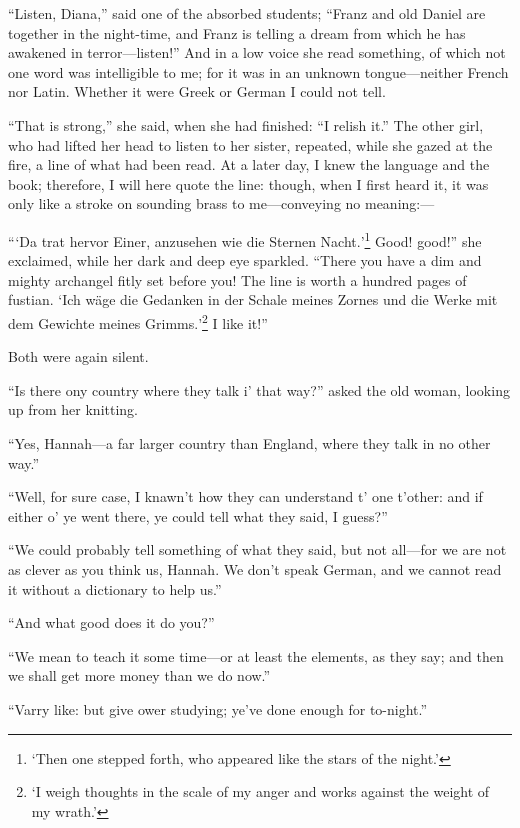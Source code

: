 \enquote{Listen, Diana,} said one of the absorbed students;
\enquote{Franz and old Daniel are together in the night-time, and Franz
	is telling a dream from which he has awakened in terror---listen!} And
in a low voice she read something, of which not one word was
intelligible to me; for it was in an unknown tongue---neither French nor
Latin. Whether it were Greek or German I could not tell.

\enquote{That is strong,} she said, when she had finished: \enquote{I
	relish it.} The other girl, who had lifted her head to listen to her
sister, repeated, while she gazed at the fire, a line of what had been
read. At a later day, I knew the language and the book; therefore, I
will here quote the line: though, when I first heard it, it was only
like a stroke on sounding brass to me---conveying no meaning:---

\enquote{\foreignquote{german}{Da trat hervor Einer, anzusehen wie die Sternen
		Nacht.}\footnote{\enquote{Then one stepped forth, who appeared like the stars of the night.}}
	Good! good!} she exclaimed, while her dark and deep eye
sparkled. \enquote{There you have a dim and mighty archangel fitly set
	before you! The line is worth a hundred pages of fustian.
	\foreignquote{german}{Ich wäge die Gedanken in der Schale meines Zornes und die
		Werke mit dem Gewichte meines Grimms.}\footnote{
		\enquote{I weigh thoughts in the scale of my anger and works against the weight of my wrath.}} I like it!}

Both were again silent.

\enquote{Is there ony country where they talk i' that way?} asked the
old woman, looking up from her knitting.

\enquote{Yes, Hannah---a far larger country than England, where they
	talk in no other way.}

\enquote{Well, for sure case, I knawn't how they can understand t' one
	t'other: and if either o' ye went there, ye could tell what they said, I
	guess?}

\enquote{We could probably tell something of what they said, but not
	all---for we are not as clever as you think us, Hannah. We don't speak
	German, and we cannot read it without a dictionary to help us.}

\enquote{And what good does it do you?}

\enquote{We mean to teach it some time---or at least the elements, as
	they say; and then we shall get more money than we do now.}

\enquote{Varry like: but give ower studying; ye've done enough for
	to-night.}

